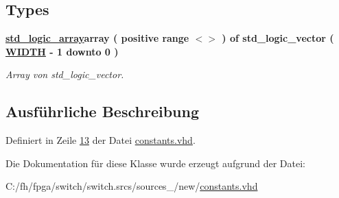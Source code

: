\subsection*{Types}
 \begin{DoxyCompactItemize}
\item 
\mbox{\label{classswitch__constants_ab8800f6bfb13a05fb4b8f9cf70129f9a}} 
{\bfseries \mbox{\hyperlink{classswitch__constants_ab8800f6bfb13a05fb4b8f9cf70129f9a}{std\+\_\+logic\+\_\+array}}{\bfseries \textcolor{keywordflow}{array}\textcolor{vhdlchar}{ }\textcolor{vhdlchar}{(}\textcolor{vhdlchar}{ }\textcolor{vhdlchar}{positive}\textcolor{vhdlchar}{ }\textcolor{keywordflow}{range}\textcolor{vhdlchar}{ }\textcolor{vhdlchar}{$<$$>$}\textcolor{vhdlchar}{ }\textcolor{vhdlchar}{)}\textcolor{vhdlchar}{ }\textcolor{vhdlchar}{ }\textcolor{keywordflow}{of}\textcolor{vhdlchar}{ }\textcolor{comment}{std\+\_\+logic\+\_\+vector}\textcolor{vhdlchar}{ }\textcolor{vhdlchar}{(}\textcolor{vhdlchar}{ }\textcolor{vhdlchar}{ }\textcolor{vhdlchar}{ }\textcolor{vhdlchar}{ }{\bfseries \mbox{\hyperlink{classswitch__constants_a61f3545de1fd97e083485647537d2a2d}{W\+I\+D\+TH}}} \textcolor{vhdlchar}{-\/}\textcolor{vhdlchar}{ } \textcolor{vhdldigit}{1} \textcolor{vhdlchar}{ }\textcolor{keywordflow}{downto}\textcolor{vhdlchar}{ }\textcolor{vhdlchar}{ } \textcolor{vhdldigit}{0} \textcolor{vhdlchar}{ }\textcolor{vhdlchar}{)}\textcolor{vhdlchar}{ }}} 
\begin{DoxyCompactList}\small\item\em Array von std\+\_\+logic\+\_\+vector. \end{DoxyCompactList}\end{DoxyCompactItemize}


\subsection{Ausführliche Beschreibung}


Definiert in Zeile \mbox{\hyperlink{constants_8vhd_source_l00013}{13}} der Datei \mbox{\hyperlink{constants_8vhd_source}{constants.\+vhd}}.



Die Dokumentation für diese Klasse wurde erzeugt aufgrund der Datei\+:\begin{DoxyCompactItemize}
\item 
C\+:/fh/fpga/switch/switch.\+srcs/sources\+\_/new/\mbox{\hyperlink{constants_8vhd}{constants.\+vhd}}\end{DoxyCompactItemize}
